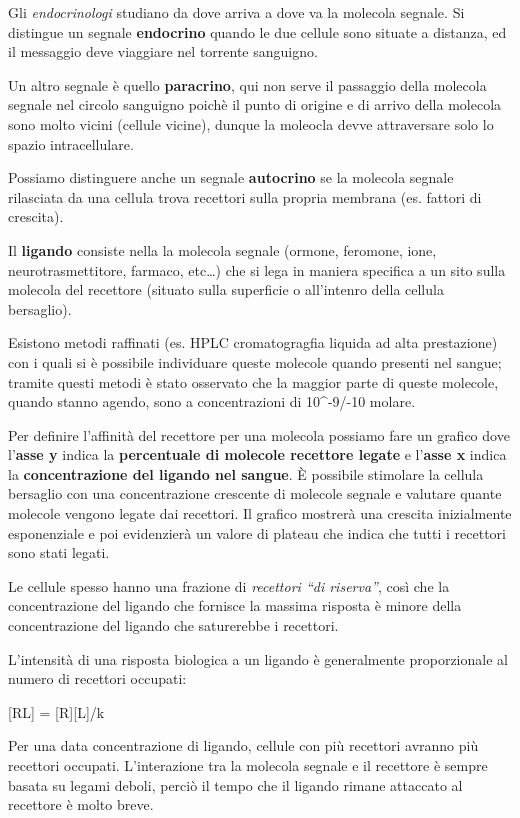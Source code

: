 \documentclass[]{article}
\begin{document}
Gli \emph{endocrinologi} studiano da dove arriva a dove va la molecola
segnale. Si distingue un segnale \textbf{endocrino} quando le due
cellule sono situate a distanza, ed il messaggio deve viaggiare nel
torrente sanguigno.

Un altro segnale è quello \textbf{paracrino}, qui non serve il passaggio
della molecola segnale nel circolo sanguigno poichè il punto di origine
e di arrivo della molecola sono molto vicini (cellule vicine), dunque la
moleocla devve attraversare solo lo spazio intracellulare.

Possiamo distinguere anche un segnale \textbf{autocrino} se la molecola
segnale rilasciata da una cellula trova recettori sulla propria membrana
(es. fattori di crescita).

Il \textbf{ligando} consiste nella la molecola segnale (ormone,
feromone, ione, neurotrasmettitore, farmaco, etc\ldots{}) che si lega in
maniera specifica a un sito sulla molecola del recettore (situato sulla
superficie o all'intenro della cellula bersaglio).

Esistono metodi raffinati (es. HPLC cromatogragfia liquida ad alta
prestazione) con i quali si è possibile individuare queste molecole
quando presenti nel sangue; tramite questi metodi è stato osservato che
la maggior parte di queste molecole, quando stanno agendo, sono a
concentrazioni di 10\^{}-9/-10 molare.

Per definire l'affinità del recettore per una molecola possiamo fare un
grafico dove l'\textbf{asse y} indica la \textbf{percentuale di molecole
recettore legate} e l'\textbf{asse x} indica la \textbf{concentrazione
del ligando nel sangue}. È possibile stimolare la cellula bersaglio con
una concentrazione crescente di molecole segnale e valutare quante
molecole vengono legate dai recettori. Il grafico mostrerà una crescita
inizialmente esponenziale e poi evidenzierà un valore di plateau che
indica che tutti i recettori sono stati legati.

Le cellule spesso hanno una frazione di \emph{recettori ``di riserva''},
così che la concentrazione del ligando che fornisce la massima risposta
è minore della concentrazione del ligando che saturerebbe i recettori.

L'intensità di una risposta biologica a un ligando è generalmente
proporzionale al numero di recettori occupati:

{[}RL{]} = {[}R{]}{[}L{]}/k

Per una data concentrazione di ligando, cellule con più recettori
avranno più recettori occupati. L'interazione tra la molecola segnale e
il recettore è sempre basata su legami deboli, perciò il tempo che il
ligando rimane attaccato al recettore è molto breve.
\end{document}
